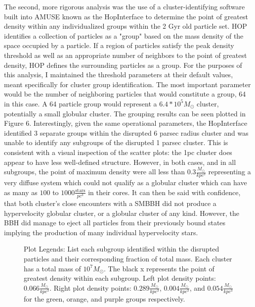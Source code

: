 \documentclass{aastex62}
\begin{document}
The second, more rigorous analysis was the use of a cluster-identifying software built into AMUSE known as the HopInterface \citep{eisen98} to determine the point of greatest density within any individualized groups within the 2 Gyr old particle set. HOP identifies a collection of particles as a "group" based on the mass density of the space occupied by a particle. If a region of particles satisfy the peak density threshold as well as an appropriate number of neighbors to the point of greatest density, HOP defines the surrounding particles as a group. For the purposes of this analysis, I maintained the threshold parameters at their default values, meant specifically for cluster group identification. The most important parameter would be the number of neighboring particles that would constitute a group, 64 in this case. A 64 particle group would represent a $6.4 * 10^5 M_{\odot}$ cluster, potentially a small globular cluster. The grouping results can be seen plotted in Figure 6. Interestingly, given the same operational parameters, the HopInterface identified 3 separate groups within the disrupted 6 parsec radius cluster and was unable to identify any subgroups of the disrupted 1 parsec cluster. This is consistent with a visual inspection of the scatter plots: the 1pc cluster does appear to have less well-defined structure. However, in both cases, and in all subgroups, the point of maximum density were all less than $0.3 \frac{M_{\odot}}{kpc^3}$ representing a very diffuse system which could not qualify as a globular cluster which can have as many as $100$ to $1000 \frac{\text{stars}}{pc^3}$ in their cores. It can then be said with confidence, that both cluster's close encounters with a SMBBH did not produce a hypervelocity globular cluster, or a globular cluster of any kind. However, the BBH did manage to eject all particles from their previously bound states implying the production of many individual hypervelocity stars.

\begin{figure}
\centering
\caption{Plot Legends: List each subgroup identified within the disrupted particles and their corresponding fraction of total mass. Each cluster has a total mass of $10^7 M_{\odot}$. The black x represents the point of greatest density within each subgroup. Left plot density points: $0.066 \frac{M_{\odot}}{kpc^3}$. Right plot density points: $0.289 \frac{M_{\odot}}{kpc^3}$, $0.004 \frac{M_{\odot}}{kpc^3}$, and $0.054 \frac{M_{\odot}}{kpc^3}$ for the green, orange, and purple groups respectively.}
\end{figure}
\end{document}
